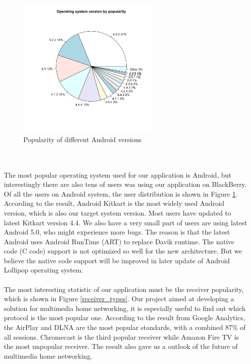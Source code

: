 \\
\begin{figure}[htb]
\centering \includegraphics[height=7cm]{charts/os_version_popularity}
\caption{Popularity of different Android versions \label{os_versions}}
\end{figure}\\
\\
The most popular operating system used for our application is Android, but interestingly there are also tens of users was using our application on BlackBerry. Of all the users on Android system, the user distribution is shown in Figure \ref{os_versions}. According to the result, Android Kitkart is the most widely used Android version, which is also our target system version. Most users have updated to latest Kitkart version 4.4. We also have a very small part of users are using latest Android 5.0, who might experience more bugs. The reason is that the latest Android uses Android RunTime (ART) to replace Davik runtime. The native code (C code) support is not optimized so well for the new architecture. But we believe the native code support will be improved in later update of Android Lollipop operating system.\\
\\
The most interesting statistic of our application must be the receiver popularity, which is shown in Figure \ref{receiver_types}. Our project aimed at developing a solution for multimedia home networking, it is especially useful to find out which protocol is the most popular one. According to the result from Google Analytics, the AirPlay and DLNA are the most popular standards, with a combined 87\% of all sessions. Chromecast is the third popular receiver while Amazon Fire TV is the most unpopular receiver. The result also gave us a outlook of the future of multimedia home networking.\\
\\
